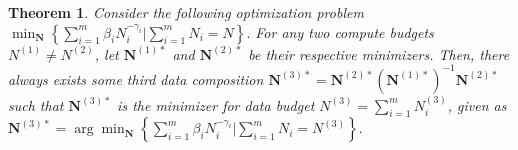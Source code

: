 \documentclass{article} %
\newtheorem{theorem}{Theorem}
\newcommand{\rrm}[1]{\textbf{\textcolor{red!50}{[Rafid: #1]}}}
\newcommand{\rrmso}[2]{\sout{#1}\rrm{#2}}
\begin{document}

\begin{theorem}\label{thm:thm1n}
    Consider the following optimization problem
    $
        \min_{\mathbf{N}} \left\{ \sum_{i=1}^m \beta_i N_i^{-\gamma_i} \Bigg| \sum_{i=1}^m N_i = N \right\}.
    $
    For any two compute budgets $N^{(1)} \neq N^{(2)}$, let $\mathbf{N}^{(1)*}$ and $\mathbf{N}^{(2)*}$ be their respective minimizers. 
    Then, there always exists some third data composition $ \mathbf{N}^{(3)*} = \mathbf{N}^{(2)*}(\mathbf{N}^{(1)*}) ^{-1} \mathbf{N}^{(2)*}$ such that $\mathbf{N}^{(3)*}$ is the minimizer for data budget $N^{(3)}=\sum_{i=1}^m N^{(3)}_i$, given as 
         $
        \mathbf{N}^{(3)*} = \arg\min_{\mathbf{N}} \left\{ \sum_{i=1}^m \beta_i N_i^{-\gamma_i} \Bigg| \sum_{i=1}^m N_i = N^{(3)} \right\}.
    $
\end{theorem}\vspace{-0.5em}
\end{document}
